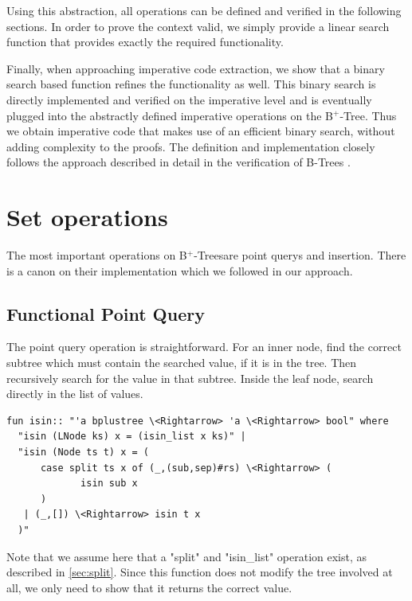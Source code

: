 \documentclass[a4paper,UKenglish,cleveref, autoref, thm-restate]{lipics-v2021}
\newcommand{\btree}{B$^+$-Tree}
\newcommand{\btrees}{B$^+$-Trees}
\begin{document}
Using this abstraction, all operations can be defined and verified
in the following sections.
In order to prove the context valid, we simply provide a linear search function
that provides exactly the required functionality.

Finally, when approaching imperative code extraction,
we show that a binary search based function refines the
functionality as well.
This binary search is directly implemented and verified on the imperative
level and is eventually plugged into the abstractly defined
imperative operations on the \btree.
Thus we obtain imperative code that makes use of an efficient
binary search, without adding complexity to the proofs.
The definition and implementation closely follows
the approach described in detail in the
verification of B-Trees \cite{DBLP:journals/afp/Mundler21}.


\section{Set operations}
\label{sec:set}

The most important operations on \btrees are point querys and insertion.
There is a canon on their implementation which we followed in our approach.

\subsection{Functional Point Query}
\label{sec:functional_pq}

The point query operation is straightforward.
For an inner node, find the correct subtree which must contain
the searched value, if it is in the tree.
Then recursively search for the value in that subtree.
Inside the leaf node, search directly in the list of values.

\begin{lstlisting}[mathescape=true, language=Isabelle,label=lst:isin-def]
fun isin:: "'a bplustree \<Rightarrow> 'a \<Rightarrow> bool" where
  "isin (LNode ks) x = (isin_list x ks)" |
  "isin (Node ts t) x = (
      case split ts x of (_,(sub,sep)#rs) \<Rightarrow> (
             isin sub x
      )
   | (_,[]) \<Rightarrow> isin t x
  )"
\end{lstlisting}

Note that we assume here that a "split" and "isin\_list" operation exist,
as described in \autoref{sec:split}.
Since this function does not modify the tree involved at all,
we only need to show that it returns the correct value.
\end{document}
